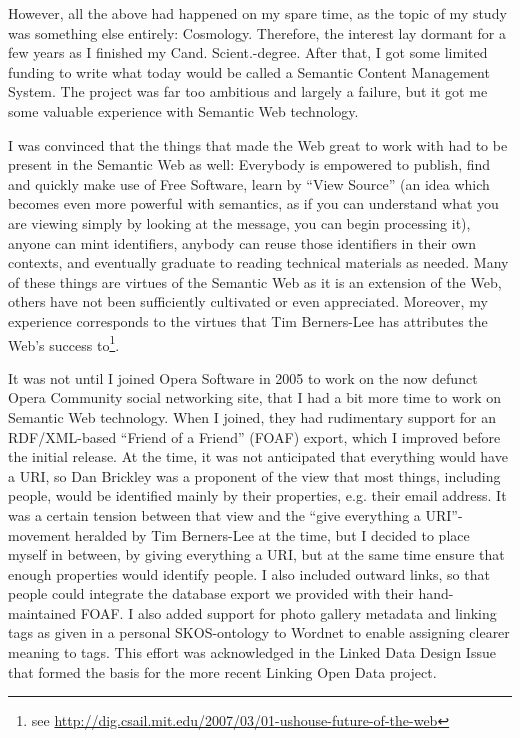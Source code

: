 However, all the above had happened on my spare time, as the topic of
my study was something else entirely: Cosmology. Therefore, the
interest lay dormant for a few years as I finished my
Cand. Scient.-degree.  After that, I got some limited funding to write
what today would be called a Semantic Content Management System. The
project was far too ambitious and largely a failure, but it got me
some valuable experience with Semantic Web technology.

I was convinced that the things that made the Web great to work with
had to be present in the Semantic Web as well: Everybody is empowered
to publish, find and quickly make use of Free Software, learn by
``View Source'' (an idea which becomes even more powerful with
semantics, as if you can understand what you are viewing simply by
looking at the message, you can begin processing it), anyone can mint
identifiers, anybody can reuse those identifiers in their own
contexts, and eventually graduate to reading technical materials as
needed. Many of these things are virtues of the Semantic Web as it is
an extension of the Web, others have not been sufficiently cultivated
or even appreciated. Moreover, my experience corresponds to the
virtues that Tim Berners-Lee has attributes the Web's success
to\footnote{see
  \url{http://dig.csail.mit.edu/2007/03/01-ushouse-future-of-the-web}}.

It was not until I joined Opera Software in 2005 to work on the now
defunct Opera Community social networking site, that I had a bit more
time to work on Semantic Web technology. When I joined, they had
rudimentary support for an RDF/XML-based ``Friend of a Friend'' (FOAF)
export, which I improved before the initial release. At the time, it
was not anticipated that everything would have a URI, so Dan Brickley
was a proponent of the view that most things, including people, would
be identified mainly by their properties, e.g. their email address. It
was a certain tension between that view and the ``give everything a
URI''-movement heralded by Tim Berners-Lee at the time, but I decided
to place myself in between, by giving everything a URI, but at the
same time ensure that enough properties would identify people. I also
included outward links, so that people could integrate the database
export we provided with their hand-maintained FOAF. I also added
support for photo gallery metadata and linking tags as given in a
personal SKOS-ontology to Wordnet to enable assigning clearer meaning
to tags. This effort was acknowledged in the Linked Data Design
Issue\cite{linkeddataissue} that formed the basis for the more recent Linking
Open Data project.

